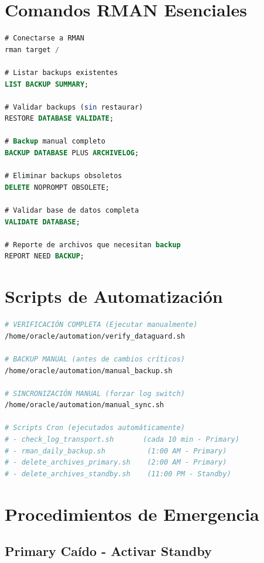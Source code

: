 \documentclass[11pt, a4paper]{report}
\begin{document}
\section{Comandos RMAN Esenciales}

\begin{lstlisting}[language=SQL, caption={Operaciones de Backup con RMAN}]
# Conectarse a RMAN
rman target /

# Listar backups existentes
LIST BACKUP SUMMARY;

# Validar backups (sin restaurar)
RESTORE DATABASE VALIDATE;

# Backup manual completo
BACKUP DATABASE PLUS ARCHIVELOG;

# Eliminar backups obsoletos
DELETE NOPROMPT OBSOLETE;

# Validar base de datos completa
VALIDATE DATABASE;

# Reporte de archivos que necesitan backup
REPORT NEED BACKUP;
\end{lstlisting}

\section{Scripts de Automatización}

\begin{lstlisting}[language=bash, caption={Scripts Disponibles en /home/oracle/automation/}]
# VERIFICACIÓN COMPLETA (Ejecutar manualmente)
/home/oracle/automation/verify_dataguard.sh

# BACKUP MANUAL (antes de cambios críticos)
/home/oracle/automation/manual_backup.sh

# SINCRONIZACIÓN MANUAL (forzar log switch)
/home/oracle/automation/manual_sync.sh

# Scripts Cron (ejecutados automáticamente)
# - check_log_transport.sh       (cada 10 min - Primary)
# - rman_daily_backup.sh          (1:00 AM - Primary)
# - delete_archives_primary.sh    (2:00 AM - Primary)
# - delete_archives_standby.sh    (11:00 PM - Standby)
\end{lstlisting}

\section{Procedimientos de Emergencia}

\subsection{Primary Caído - Activar Standby}
\end{document}
